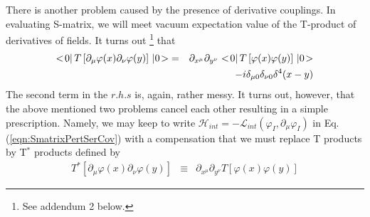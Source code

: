 There is another problem caused by the presence of derivative couplings.
In evaluating S-matrix, we will meet vacuum expectation value of
the T-product of derivatives of fields. 
It turns out
\footnote{%
See addendum 2 below.
}%
 that
\begin{eqnarray}
<\! 0 |\, T\left[
\partial_\mu \varphi(x) \partial_\nu \varphi(y) \right]
\,| 0 \!>
&=&
\partial_{x^\mu}
\partial_{y^\nu}
<\! 0 |\, T\left[
\varphi(x) \varphi(y) \right]
\,| 0 \!>
\nonumber\\
&&
-
i \delta_{\mu 0} \delta_{\nu 0}
\delta^4(x - y)
\label{eqn:DerivCoupTprod}
\end{eqnarray}
The second term in the $r.h.s$ is, again, rather messy.
It turns out, however, that the above mentioned two problems cancel each other
resulting in a  simple prescription.
Namely, we may keep to write 
$\mathcal{H}_{int} = -\mathcal{L}_{int}(\varphi_I, \partial_\mu \varphi_I)$ 
in Eq. (\ref{eqn:SmatrixPertSerCov})
with a compensation that we must replace T products by
T${}^*$ products defined by
\begin{eqnarray}
T^*\left[
\partial_\mu \varphi(x) \partial_\nu \varphi(y) \right]
&\equiv&
\partial_{x^\mu}
\partial_{y^\nu}
T\left[
\varphi(x) \varphi(y) \right]
\end{eqnarray}

\bigskip

